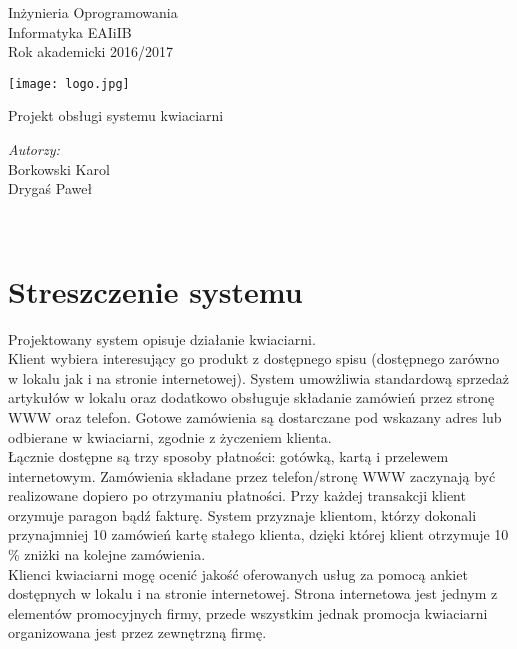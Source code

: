 \documentclass[a4paper,12pt]{article}
\begin{document}
	\begin{titlepage}
		\center 
		\Large Inżynieria Oprogramowania\\[0.5cm]
		\large Informatyka EAIiIB\\
		\large Rok akademicki 2016/2017\\[0.1cm]
		\begin{center}
            \texttt{[image: logo.jpg]}
        \end{center}
		\fontsize{40}{8}\selectfont Projekt obsługi systemu kwiaciarni\\[6.5cm]
		\begin{minipage}{1.1\textwidth}
			\begin{flushright} \Large
				\emph{Autorzy:}\\
				Borkowski Karol\\
				Drygaś Paweł
			\end{flushright}
		\end{minipage}\\[4cm]	
		\vfill		
	\end{titlepage}
	\tableofcontents
	\newpage
	\section{Streszczenie systemu}
	 Projektowany system opisuje działanie kwiaciarni. \\	
	Klient wybiera interesujący go produkt z dostępnego spisu (dostępnego zarówno w lokalu jak i na stronie internetowej). System umowżliwia standardową sprzedaż artykułów w lokalu oraz dodatkowo obsługuje składanie zamówień przez stronę WWW oraz telefon. 
	Gotowe zamówienia są dostarczane pod wskazany adres lub odbierane w kwiaciarni, zgodnie z życzeniem klienta. \\ Łącznie dostępne są trzy sposoby płatności: gotówką, kartą i przelewem internetowym. Zamówienia składane przez telefon/stronę WWW zaczynają być realizowane dopiero po otrzymaniu płatności. Przy każdej transakcji klient orzymuje paragon bądź fakturę.
	System przyznaje klientom, którzy dokonali przynajmniej 10 zamówień kartę stałego klienta, dzięki której klient otrzymuje 10 \% zniżki na kolejne zamówienia.
	\\
	Klienci kwiaciarni mogę ocenić jakość oferowanych usług za pomocą ankiet dostępnych w lokalu i na stronie internetowej. Strona internetowa jest jednym z elementów promocyjnych firmy, przede wszystkim jednak promocja kwiaciarni organizowana jest przez zewnętrzną firmę.
	\newpage
\end{document}
